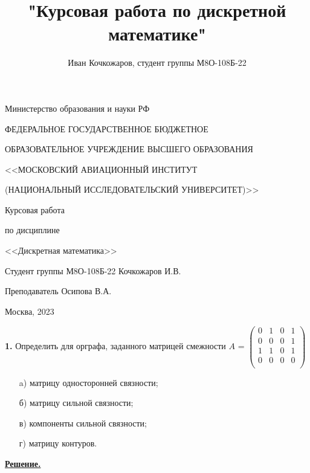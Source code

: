 \documentclass[12pt, letterpaper, titlepage]{article}
\title{"Курсовая работа по дискретной математике"}
\author{Иван Кочкожаров, студент группы М8О-108Б-22}
\begin{document}
\begin{titlepage}

    \thispagestyle{empty}
    
    \centerline{Министерство образования и науки РФ}
    \centerline{ФЕДЕРАЛЬНОЕ ГОСУДАРСТВЕННОЕ БЮДЖЕТНОЕ}
    \centerline{ОБРАЗОВАТЕЛЬНОЕ
    УЧРЕЖДЕНИЕ ВЫСШЕГО ОБРАЗОВАНИЯ}
    \centerline{<<МОСКОВСКИЙ АВИАЦИОННЫЙ ИНСТИТУТ}
    \centerline{(НАЦИОНАЛЬНЫЙ ИССЛЕДОВАТЕЛЬСКИЙ УНИВЕРСИТЕТ)>>}
    
    \vfill
    
    \centerline{\Huge{Курсовая работа}}
    \centerline{\large{по дисциплине}}
    \centerline{\Huge{<<Дискретная математика>>}}
    
    \vfill
    
    Студент группы М8О-108Б-22 \hfill Кочкожаров И.В.
    
    Преподаватель \hfill Осипова В.А.
    
    \vfill
    
    \centerline{Москва, 2023}
    \clearpage
\end{titlepage}
\textbf{1.} Определить для орграфа, заданного матрицей смежности $A$ =
$
    \begin{pmatrix}
        0 & 1 & 0 & 1 \\
        0 & 0 & 0 & 1 \\
        1 & 1 & 0 & 1 \\
        0 & 0 & 0 & 0 \\
    \end{pmatrix}
$
\begin{itemize}
    \item[a)] матрицу односторонней связности;
    \item[б)] матрицу сильной связности;
    \item[в)] компоненты сильной связности;
    \item[г)] матрицу контуров.
\end{itemize}
\underline{\textbf{Решение.}}
\end{document}
